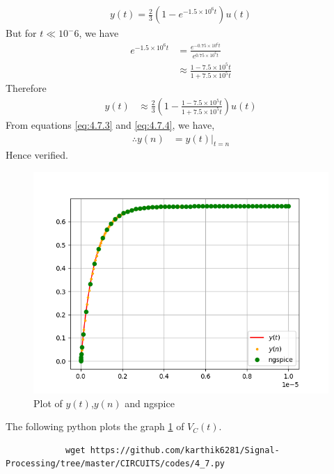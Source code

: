 \documentclass[journal,12pt,twocolumn]{IEEEtran}
\providecommand{\brak}[1]{\ensuremath{\left(#1\right)}}
\numberwithin{equation}{section}
\renewcommand\thesection{\arabic{section}}
\begin{document}
\begin{enumerate}[label=\thesection.\arabic*.,ref=\thesection.\theenumi]
		\begin{align}
			y(t) = \frac{2}{3}\brak{1 - e^{-1.5\times10^6t}}u(t)
		\end{align}
		But for $t \ll 10^-6$, we have
		\begin{align}
			e^{-1.5\times 10^6 t} &= \frac{e^{-0.75 \times 10^6 t}}{e^{0.75 \times 10^6 t}} \\
			&\approx \frac{1-7.5\times10^5t}{1+7.5\times10^5t}  
		\end{align}
		Therefore
		\begin{align}
			\label{eq:4.7.4}
			y(t) &\approx \frac{2}{3} \brak{1 - \frac{1-7.5\times10^5t}{1+7.5\times10^5t}} u(t) 
		\end{align}
		From equations \eqref{eq:4.7.3} and \eqref{eq:4.7.4}, we have,
		\begin{align}
			\therefore y(n) &= y(t)|_{t=n}
		\end{align}
		Hence verified.
		\begin{figure}[!ht]
			\centering
			\includegraphics[width=\columnwidth]{./figs/4_7.png}
			\caption{Plot of $y(t)$,$y(n)$ and ngspice}
			\label{fig:4.7}	
		\end{figure}
		The following python plots the graph \ref{fig:4.7} of $V_C(t)$.
		\begin{lstlisting}
			wget https://github.com/karthik6281/Signal-Processing/tree/master/CIRCUITS/codes/4_7.py
		\end{lstlisting}
		
	\end{enumerate}
	
\end{document}
